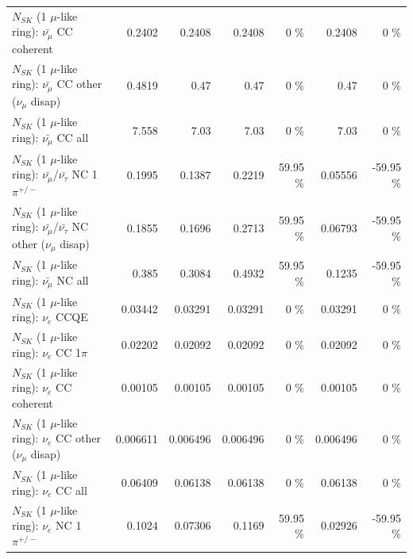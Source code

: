 \begin{table}
\begin{tabular}{| l | r | r | r  r | r  r |}
                       $N_{SK}$ (1 $\mu$-like ring): $\bar{\nu_\mu}$ CC coherent &          0.2402 &          0.2408 &          0.2408 &        0 \%  &          0.2408 &        0 \%  \\ 
        $N_{SK}$ (1 $\mu$-like ring): $\bar{\nu_\mu}$ CC other ($\nu_\mu$ disap) &          0.4819 &            0.47 &            0.47 &        0 \%  &            0.47 &        0 \%  \\ 
                          $N_{SK}$ (1 $\mu$-like ring): $\bar{\nu_{\mu}}$ CC all &           7.558 &            7.03 &            7.03 &        0 \%  &            7.03 &        0 \%  \\ 
\hline
  $N_{SK}$ (1 $\mu$-like ring): $\bar{\nu_\mu}$/$\bar{\nu_\tau}$ NC 1$\pi^{+/-}$ &          0.1995 &          0.1387 &          0.2219 &    59.95 \%  &         0.05556 &   -59.95 \%  \\ 
$N_{SK}$ (1 $\mu$-like ring): $\bar{\nu_\mu}$/$\bar{\nu_\tau}$ NC other ($\nu_\mu$ disap) &          0.1855 &          0.1696 &          0.2713 &    59.95 \%  &         0.06793 &   -59.95 \%  \\ 
                          $N_{SK}$ (1 $\mu$-like ring): $\bar{\nu_{\mu}}$ NC all &           0.385 &          0.3084 &          0.4932 &    59.95 \%  &          0.1235 &   -59.95 \%  \\ 
\hline
\hline
\hline
                                      $N_{SK}$ (1 $\mu$-like ring): $\nu_e$ CCQE &         0.03442 &         0.03291 &         0.03291 &        0 \%  &         0.03291 &        0 \%  \\ 
                                 $N_{SK}$ (1 $\mu$-like ring): $\nu_e$ CC 1$\pi$ &         0.02202 &         0.02092 &         0.02092 &        0 \%  &         0.02092 &        0 \%  \\ 
                               $N_{SK}$ (1 $\mu$-like ring): $\nu_e$ CC coherent &         0.00105 &         0.00105 &         0.00105 &        0 \%  &         0.00105 &        0 \%  \\ 
                $N_{SK}$ (1 $\mu$-like ring): $\nu_e$ CC other ($\nu_\mu$ disap) &        0.006611 &        0.006496 &        0.006496 &        0 \%  &        0.006496 &        0 \%  \\ 
                                  $N_{SK}$ (1 $\mu$-like ring): $\nu_{e}$ CC all &         0.06409 &         0.06138 &         0.06138 &        0 \%  &         0.06138 &        0 \%  \\ 
\hline
                           $N_{SK}$ (1 $\mu$-like ring): $\nu_e$ NC 1$\pi^{+/-}$ &          0.1024 &         0.07306 &          0.1169 &    59.95 \%  &         0.02926 &   -59.95 \%  \\ 

\end{tabular}
\end{table}
